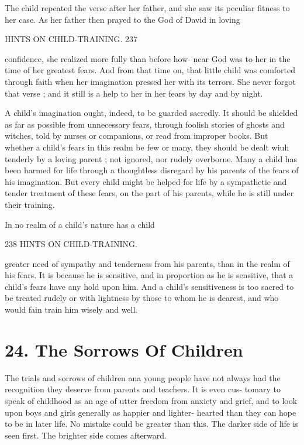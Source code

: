 \documentclass[
]{book}
\begin{document}
The child repeated the verse after her father, and she saw its peculiar fitness to her case. As her father then prayed to the God of David in loving

HINTS ON CHILD-TRAINING. 237

confidence, she realized more fully than before how- near God was to her in the time of her greatest fears. And from that time on, that little child was comforted through faith when her imagination pressed her with its terrors. She never forgot that verse ; and it still is a help to her in her fears by day and by night.

A child's imagination ought, indeed, to be guarded sacredly. It should be shielded as far as possible from unnecessary fears, through foolish stories of ghosts and witches, told by nurses or companions, or read from improper books. But whether a child's fears in this realm be few or many, they should be dealt wiuh tenderly by a loving parent ; not ignored, nor rudely overborne. Many a child has been harmed for life through a thoughtless disregard by his parents of the fears of his imagination. But every child might be helped for life by a sympathetic and tender treatment of these fears, on the part of his parents, while he is still under their training.

In no realm of a child's nature has a child

238 HINTS ON CHILD-TRAINING.

greater need of sympathy and tenderness from his parents, than in the realm of his fears. It is because he is sensitive, and in proportion as he is sensitive, that a child's fears have any hold upon him. And a child's sensitiveness is too sacred to be treated rudely or with lightness by those to whom he is dearest, and who would fain train him wisely and well.

\hypertarget{the-sorrows-of-children}{%
\chapter{24. The Sorrows Of Children}\label{the-sorrows-of-children}}

The trials and sorrows of children ana young people have not always had the recognition they deserve from parents and teachers. It is even cus- tomary to speak of childhood as an age of utter freedom from anxiety and grief, and to look upon boys and girls generally as happier and lighter- hearted than they can hope to be in later life. No mistake could be greater than this. The darker side of life is seen first. The brighter side comes afterward.
\end{document}
